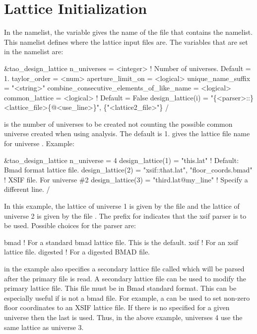 \section{Lattice Initialization}
\label{s:init.lat} 

In the  namelist, the  variable gives
the name of the file that contains the 
namelist. This namelist defines where the lattice input files are. The
variables that are set in the  namelist are:
\begin{example}
  &tao_design_lattice
    n_universes        = <integer>      ! Number of universes. Default = 1.
    taylor_order       = <num>
    aperture_limit_on  = <logical>
    unique_name_suffix = "<string>"
    combine_consecutive_elements_of_like_name = <logical>
    common_lattice = <logical>        ! Default = False
    design_lattice(i) = "\{<parser>::\}<lattice_file>\{@<use_line>\}", \{"<lattice2_file>"\}
  /
\end{example}

 is the number of universes to be created not counting
the possible common universe created when using  analysis. The
default is 1.   gives the lattice file name for
universe .  Example:
\begin{example}
  &tao_design_lattice
    n_universe = 4
    design_lattice(1) = "this.lat"      ! Default: Bmad format lattice file.
    design_lattice(2) = "xsif::that.lat", "floor_coords.bmad"
                                        ! XSIF file. For universe \#2 
    design_lattice(3) = "third.lat@my_line"  ! Specify a different line.
  /
\end{example}
In this example, the lattice of universe 1 is given by the file
 and the lattice of universe 2 is given by the file
. The  prefix for 
indicates that the xsif parser is to be used. Possible
choices for the parser are:
\begin{example}
  bmad      ! For a standard bmad lattice file. This is the default.
  xsif      ! For an xsif lattice file.
  digested  ! For a digested BMAD file.
\end{example}
 in the example also specifies a secondary
lattice file called  which will be parsed after
the primary  file is read. A secondary lattice file can
be used to modify the primary lattice file. This file must be in Bmad
standard format. This can be especially useful if  is
not a bmad file. For example, a  can be used to set
non-zero floor coordinates to an XSIF lattice file. If there is no
 specified for a given universe then the last
 is used. Thus, in the above example, universes 4
use the same lattice as universe 3.

